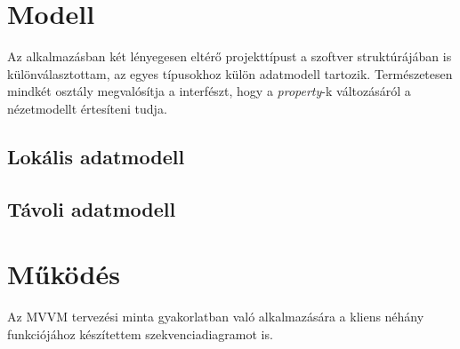 \section{Modell}

Az alkalmazásban két lényegesen eltérő projekttípust a szoftver struktúrájában is különválasztottam, az egyes típusokhoz külön adatmodell tartozik. Természetesen mindkét osztály megvalósítja a  interfészt, hogy a \emph{property}-k változásáról a nézetmodellt értesíteni tudja. 

\subsection{Lokális adatmodell}


\subsection{Távoli adatmodell}

\section{Működés}

Az MVVM tervezési minta gyakorlatban való alkalmazására a kliens néhány funkciójához készítettem szekvenciadiagramot is.
